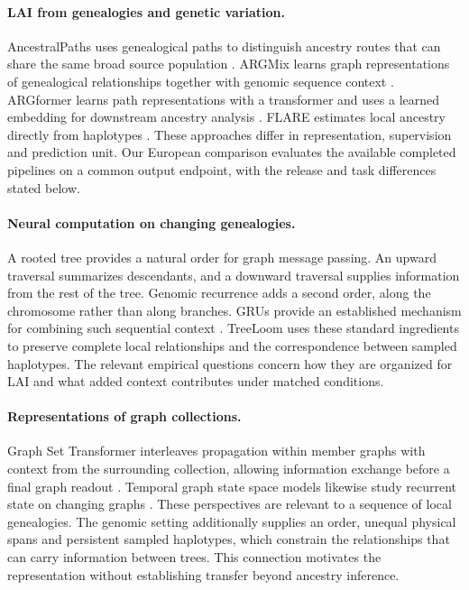 \documentclass[letterpaper]{article}
\begin{document}
\paragraph{LAI from genealogies and genetic variation.}
AncestralPaths uses genealogical paths to distinguish ancestry routes that can share the same broad source population \citep{eurasians2024}. ARGMix learns graph representations of genealogical relationships together with genomic sequence context \citep{ancientancestry2026}. ARGformer learns path representations with a transformer and uses a learned embedding for downstream ancestry analysis \citep{argformer2026}. FLARE estimates local ancestry directly from haplotypes \citep{flare2023}. These approaches differ in representation, supervision and prediction unit. Our European comparison evaluates the available completed pipelines on a common output endpoint, with the release and task differences stated below.

\paragraph{Neural computation on changing genealogies.}
A rooted tree provides a natural order for graph message passing. An upward traversal summarizes descendants, and a downward traversal supplies information from the rest of the tree. Genomic recurrence adds a second order, along the chromosome rather than along branches. GRUs provide an established mechanism for combining such sequential context \citep{gru2014}. TreeLoom uses these standard ingredients to preserve complete local relationships and the correspondence between sampled haplotypes. The relevant empirical questions concern how they are organized for LAI and what added context contributes under matched conditions.

\paragraph{Representations of graph collections.}
Graph Set Transformer interleaves propagation within member graphs with context from the surrounding collection, allowing information exchange before a final graph readout \citep{gst2026}. Temporal graph state space models likewise study recurrent state on changing graphs \citep{graphssm2024}. These perspectives are relevant to a sequence of local genealogies. The genomic setting additionally supplies an order, unequal physical spans and persistent sampled haplotypes, which constrain the relationships that can carry information between trees. This connection motivates the representation without establishing transfer beyond ancestry inference.
\end{document}
